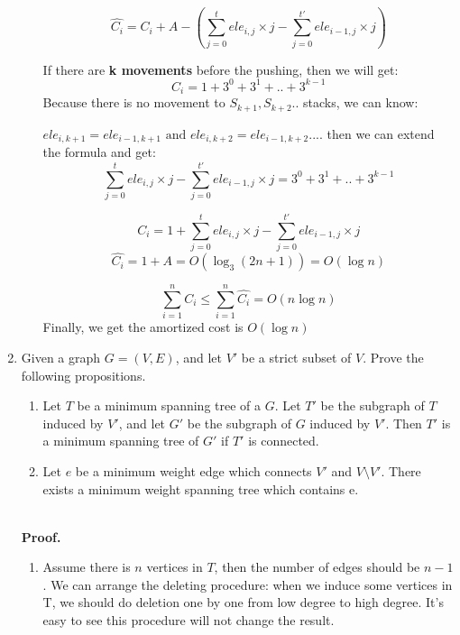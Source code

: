 \documentclass[12pt,a4paper]{article}
\theoremstyle{definition}
\begin{document}
\begin{enumerate}
\begin{enumerate}
			$$\widehat{C_i}=C_i+ A - (\sum_{j=0}^{t}ele_{i,j}\times j-\sum_{j=0}^{t'}ele_{i-1,j}\times j )$$
		
		If there  are \textbf{ k movements} before the pushing, then we will get:
		$$C_i=1+3^0+3^1+..+3^{k-1}$$
		Because there is no movement to $S_{k+1},S_{k+2}..$ stacks, we can know: 
		
		$ele_{i,k+1}=ele_{i-1,k+1} \text{ and } ele_{i,k+2}=ele_{i-1,k+2}....$ then we can extend the formula and  get: 
		$$\sum_{j=0}^{t}ele_{i,j}\times j-\sum_{j=0}^{t'}ele_{i-1,j}\times j = 3^0+3^1+..+3^{k-1}  $$
		
		
		
		 $$C_i=1+\sum_{j=0}^{t}ele_{i,j}\times j-\sum_{j=0}^{t'}ele_{i-1,j}\times j $$
		$$\widehat{C_i}=1+A=O(\log_3(2n+1))=O(\log n) $$
		
	 $$\sum_{i=1}^{n}{C_i}\leq  \sum_{i=1}^{n}\widehat{C_i}=O(n\log n)$$
		Finally, we get the amortized cost is $O(\log n)$
		

		
		
		
		
		
	\end{enumerate}
	

	
	
	
	
	\item Given a graph $G = (V, E)$, and let $V'$ be a strict subset of $V$. Prove the following propositions.
	
	\begin{enumerate}
		\item Let $T$ be a minimum spanning tree of a $G$. Let $T'$ be the subgraph of $T$ induced by $V'$, and let $G'$ be the subgraph of $G$ induced by $V'$. Then $T'$ is a minimum spanning tree of $G'$ if $T'$ is connected.
		\item Let $e$ be a minimum weight edge which connects $V'$ and $V \setminus V'$. There exists a minimum weight spanning tree which contains e.
	\end{enumerate}

	~\\
	\textbf{Proof.}
	
	\begin{enumerate}
		\item Assume there is $n$ vertices in $T$, then the number of edges should be $n-1$. We can arrange the deleting procedure: when we induce some vertices in T, we should do deletion one by one from low degree to high degree. It's easy to see this procedure will not change the result.
		

\end{enumerate}
\end{enumerate}
\end{document}

